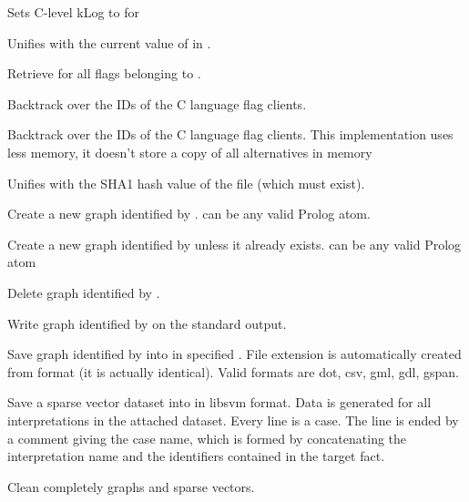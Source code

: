 \begin{description}
Sets C-level kLog  to  for 

Unifies  with the current value of  in .

Retrieve  for all flags belonging to .

Backtrack over the IDs of the C language flag clients.

Backtrack over the IDs of the C language flag clients.
This implementation uses less memory, it doesn't store a copy of all alternatives in memory

Unifies  with the SHA1 hash value of the file (which must exist).

Create a new graph identified by .  can be any valid Prolog
atom.

Create a new graph identified by  unless it already exists. 
can be any valid Prolog atom

Delete graph identified by .

Write graph identified by  on the standard output.

Save graph identified by  into  in specified
. File extension is automatically created from format (it is
actually identical). Valid formats are dot, csv, gml, gdl, gspan.

Save a sparse vector dataset into  in libsvm format. Data
is generated for all interpretations in the attached dataset. Every
line is a case. The line is ended by a comment giving the case
name, which is formed by concatenating the interpretation name and
the identifiers contained in the target fact.

Clean completely graphs and sparse vectors.


\end{description}
